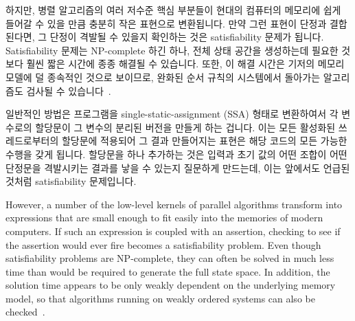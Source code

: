 \iffalse

Of course, given the importance of global state, synchronization
primitives, and aliasing, clever functional-programming experts have
proposed any number of attempts to reconcile the function programming
model to them, monads being but one case in point.

Another approach is to compile the parallel procedural program into
a functional program, then to use functional-programming tools to analyze
the result.
But it is possible to do much better than this, given that any real
computation is a large finite-state machine with finite input that
runs for a finite time interval.
This means that any real program can be transformed into an expression,
possibly albeit an impractically large one~\cite{VijayDSilva2012-sas}.

\fi

하지만, 병렬 알고리즘의 여러 저수준 핵심 부분들이 현대의 컴퓨터의 메모리에 쉽게
들어갈 수 있을 만큼 충분히 작은 표현으로 변환됩니다.
만약 그런 표현이 단정과 결합된다면, 그 단정이 격발될 수 있을지 확인하는 것은
satisfiability 문제가 됩니다.
Satisfiability 문제는 NP-complete 하긴 하나, 전체 상태 공간을 생성하는데 필요한
것보다 훨씬 짧은 시간에 종종 해결될 수 있습니다.
또한, 이 해결 시간은 기저의 메모리 모델에 덜 종속적인 것으로 보이므로, 완화된
순서 규칙의 시스템에서 돌아가는 알고리즘도 검사될 수
있습니다~\cite{JadeAlglave2013-cav}.

일반적인 방법은 프로그램을 single-static-assignment (SSA) 형태로 변환하여서 각
변수로의 할당문이 그 변수의 분리된 버전을 만들게 하는 겁니다.
이는 모든 활성화된 쓰레드로부터의 할당문에 적용되어 그 결과 만들어지는 표현은
해당 코드의 모든 가능한 수행을 갖게 됩니다.
할당문을 하나 추가하는 것은 입력과 초기 값의 어떤 조합이 어떤 단정문을
격발시키는 결과를 낳을 수 있는지 질문하게 만드는데, 이는 앞에서도 언급된 것처럼
satisfiability 문제입니다.

\iffalse

However, a number of the low-level kernels of parallel algorithms transform
into expressions that are small enough to fit easily into the memories
of modern computers.
If such an expression is coupled with an assertion, checking to see if
the assertion would ever fire becomes a satisfiability problem.
Even though satisfiability problems are NP-complete, they can often
be solved in much less time than would be required to generate the
full state space.
In addition, the solution time appears to be only weakly dependent on
the underlying memory model, so that algorithms running on weakly ordered
systems can also be checked~\cite{JadeAlglave2013-cav}.

